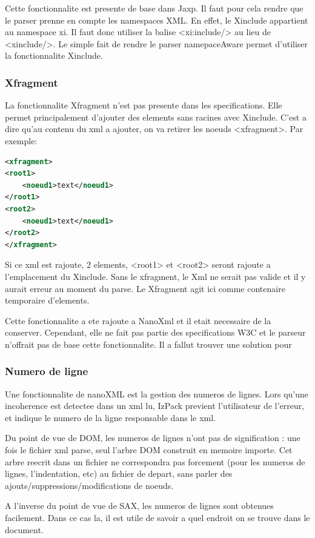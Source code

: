 Cette fonctionnalite est presente de base dans Jaxp. Il faut pour cela rendre que le parser prenne en compte les namespaces XML. En effet, le Xinclude appartient au namespace xi. Il faut donc utiliser la balise <xi:include/> au lieu de <xinclude/>. Le simple fait de rendre le parser namepaceAware permet d'utiliser la fonctionnalite Xinclude. 

\subsubsection{Xfragment}
La fonctionnalite Xfragment n'est pas presente dans les specifications. Elle permet principalement d'ajouter des elements sans racines avec Xinclude. C'est a dire qu'au contenu du xml a ajouter, on va retirer les noeuds <xfragment>. Par exemple: 
\begin{lstlisting}[language=xml]
<xfragment>
<root1>
	<noeud1>text</noeud1>
</root1>
<root2>
	<noeud1>text</noeud1>
</root2>
</xfragment>
\end{lstlisting}
Si ce xml est rajoute, 2 elements, <root1> et <root2> seront rajoute a l'emplacement du Xinclude. Sans le xfragment, le Xml ne serait pas valide et il y aurait erreur au moment du parse. Le Xfragment agit ici comme contenaire temporaire d'elements.

Cette fonctionnalite a ete rajoute a NanoXml et il etait necessaire de la conserver. Cependant, elle ne fait pas partie des specifications W3C et le parseur n'offrait pas de base cette fonctionnalite. Il a fallut trouver une solution pour 
\subsubsection{Numero de ligne}
Une fonctionnalite de nanoXML est la gestion des numeros de lignes. Lors qu'une incoherence est detectee dans un xml lu, IzPack previent l'utilisateur de l'erreur, et indique le numero de la ligne responsable dans le xml.

Du point de vue de DOM, les numeros de lignes n'ont pas de signification : une fois le fichier xml parse, seul l'arbre DOM construit en memoire importe. Cet arbre reecrit dans un fichier ne correspondra pas forcement (pour les numeros de lignes, l'indentation, etc) au fichier de depart, sans parler des ajouts/suppressions/modifications de noeuds.

A l'inverse du point de vue de SAX, les numeros de lignes sont obtenues facilement. Dans ce cas la, il est utile de savoir a quel endroit on se trouve dans le document.

